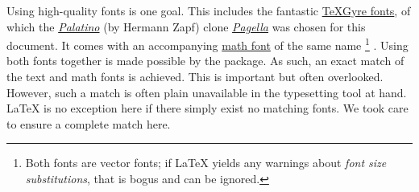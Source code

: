 Using high-quality fonts is one goal.
This includes the fantastic
\href{https://ctan.org/texarchive/fonts/tex-gyre/opentype}{\TeX Gyre fonts},
of which the \textit{\href{https://en.wikipedia.org/wiki/Palatino}{Palatino}}
(by Hermann Zapf) clone \textit{\href{https://ctan.org/pkg/tex-gyre-pagella}{Pagella}}
was chosen for this document.
It comes with an accompanying
\href{https://ctan.org/texarchive/fonts/tex-gyre-math/opentype}{math font}
of the same name%
\footnote{
    Both fonts are vector fonts;
    if \LaTeX{} yields any warnings about \emph{font size substitutions},
    that is bogus and can be ignored.
}%
.
Using both fonts together is made possible by the  package.
As such, an exact match of the text and math fonts is achieved.
This is important but often overlooked.
However, such a match is often plain unavailable in the typesetting tool at hand.
\LaTeX{} is no exception here if there simply exist no matching fonts.
We took care to ensure a complete match here.

